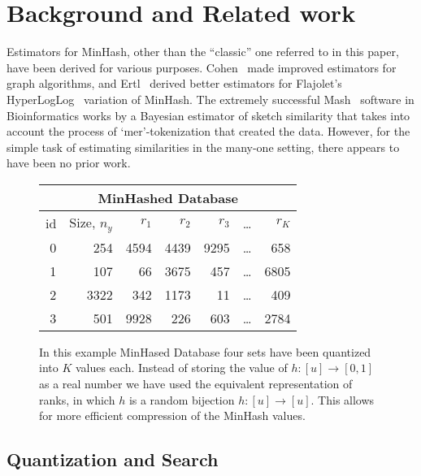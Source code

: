 
\section{Background and Related work}

Estimators for MinHash, other than the ``classic'' one referred to in this paper, have been derived for various purposes.
Cohen~\cite{DBLP:reference/algo/Cohen16b} made improved estimators for graph algorithms,
and Ertl~\cite{DBLP:journals/corr/Ertl17} derived better estimators for Flajolet's HyperLogLog~\cite{flajolet1985probabilistic} variation of MinHash.
%
The extremely successful Mash~\cite{ondov2016mash} software in Bioinformatics works by
a Bayesian estimator of sketch similarity that takes into account the process of `mer'-tokenization that created the data.
However, for the simple task of estimating similarities in the many-one setting, there appears to have been no prior work.

\begin{figure}
\centering
 \begin{tabular}{|r|r| r r r r r|} 
 \hline
     \multicolumn{7}{|c|}{MinHashed Database} \\
 \hline
 id & Size, $n_y$  & $r_1$ & $r_2$ & $r_3$ & \dots & $r_K$ \\
 \hline
 0 & 254 & 4594 & 4439 & 9295 & \dots & 658  \\
 1 & 107 & 66 & 3675 & 457 &     \dots & 6805  \\
 2 & 3322 & 342 & 1173 & 11 &    \dots & 409  \\
 3 & 501 & 9928 & 226 & 603 &    \dots & 2784  \\
  \hline
 \end{tabular}
 \caption{In this example MinHased Database four sets have been quantized into $K$ values each.
    Instead of storing the value of $h:[u]\to[0,1]$ as a real number we have used the equivalent representation of ranks, in which $h$ is a random bijection $h:[u]\to[u]$.
    This allows for more efficient compression of the MinHash values.
 }
 \label{tab:minhash-example}
\end{figure}





\subsection{Quantization and Search}

